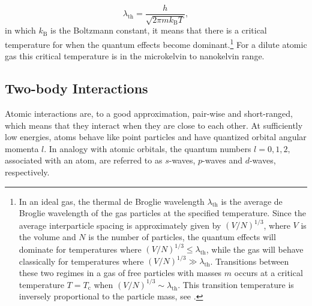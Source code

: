 \begin{equation}
\lambda_{\mathrm{th}} = \frac{h}{\sqrt{2\pi m k_{\mathrm{B}} T}},\label{eq:thermal}
\end{equation}
in which $k_{\mathrm{B}}$ is the Boltzmann constant, it means that there is a critical temperature for when the quantum effects become dominant.\footnote{In an ideal gas, the thermal de Broglie wavelength $\lambda_{\mathrm{th}}$ is the average de Broglie wavelength of the gas particles at the specified temperature. Since the average interparticle spacing is approximately given by $(V/N)^{1/3}$, where $V$ is the volume and $N$ is the number of particles, the quantum effects will dominate for temperatures where $(V/N)^{1/3} \leq \lambda_{\mathrm{th}}$, while the gas will behave classically for temperatures where $(V/N)^{1/3} \gg \lambda_{\mathrm{th}}$. Transitions between these two regimes in a gas of free particles with masses $m$ occurs at a critical temperature $T=T_{\mathrm{c}}$ when $(V/N)^{1/3} \sim \lambda_{\mathrm{th}}$. This transition temperature is inversely proportional to the particle mass, see .} For a dilute atomic gas this critical temperature is in the microkelvin to nanokelvin range.

\subsection{Two-body Interactions}
Atomic interactions are, to a good approximation, pair-wise and short-ranged, which means that they interact when they are close to each other. At sufficiently low energies, atoms behave like point particles and have quantized orbital angular momenta $l$. In analogy with atomic orbitals, the quantum numbers $l=0,1,2,$ associated with an atom, are referred to as $s$-waves, $p$-waves and $d$-waves, respectively. 

